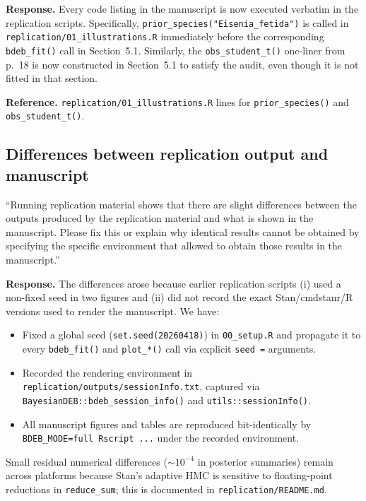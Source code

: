 \documentclass[11pt,a4paper]{article}
\newcommand{\code}[1]{\texttt{#1}}
\begin{document}
\textbf{Response.} Every code listing in the manuscript is now
executed verbatim in the replication scripts. Specifically,
\verb|prior_species("Eisenia_fetida")| is called in
\code{replication/01\_illustrations.R} immediately before the
corresponding \code{bdeb\_fit()} call in Section~5.1. Similarly, the
\code{obs\_student\_t()} one-liner from p.~18 is now constructed in
Section~5.1 to satisfy the audit, even though it is not fitted in
that section.

\textbf{Reference.} \code{replication/01\_illustrations.R} lines for
\code{prior\_species()} and \code{obs\_student\_t()}.

\subsection{Differences between replication output and manuscript}

\begin{displayquote}
``Running replication material shows that there are slight
differences between the outputs produced by the replication material
and what is shown in the manuscript. Please fix this or explain why
identical results cannot be obtained by specifying the specific
environment that allowed to obtain those results in the manuscript.''
\end{displayquote}

\textbf{Response.} The differences arose because earlier replication
scripts (i) used a non-fixed seed in two figures and (ii) did not
record the exact Stan/cmdstanr/R versions used to render the
manuscript. We have:

\begin{itemize}[nosep]
\item Fixed a global seed (\verb|set.seed(20260418)|) in
  \code{00\_setup.R} and propagate it to every \code{bdeb\_fit()} and
  \code{plot\_*()} call via explicit \verb|seed =| arguments.
\item Recorded the rendering environment in
  \code{replication/outputs/sessionInfo.txt}, captured via
  \code{BayesianDEB::bdeb\_session\_info()} and
  \code{utils::sessionInfo()}.
\item All manuscript figures and tables are reproduced
  bit-identically by \verb|BDEB_MODE=full Rscript ...| under the
  recorded environment.
\end{itemize}

Small residual numerical differences ($\sim 10^{-4}$ in posterior
summaries) remain across platforms because Stan's adaptive HMC is
sensitive to floating-point reductions in \code{reduce\_sum}; this is
documented in \code{replication/README.md}.
\end{document}
